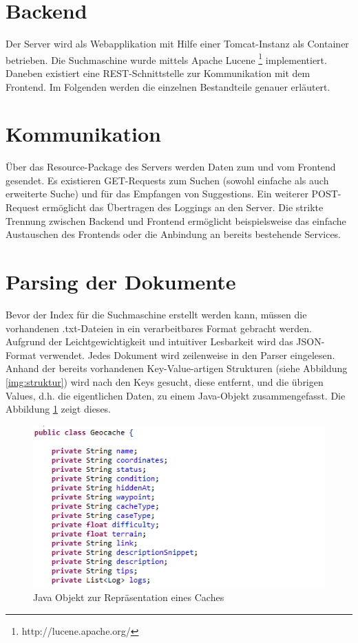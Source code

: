 \documentclass[11pt,a4paper]{scrreprt}
\begin{document}
\section{Backend}
Der Server wird als Webapplikation mit Hilfe einer Tomcat-Instanz als Container betrieben. Die Suchmaschine wurde mittels Apache Lucene \footnote{http://lucene.apache.org/} implementiert. Daneben existiert eine REST-Schnittstelle zur Kommunikation mit dem Frontend. Im Folgenden werden die einzelnen Bestandteile genauer erläutert.

\section{Kommunikation}
Über das Resource-Package des Servers werden Daten zum und vom Frontend gesendet. Es existieren GET-Requests zum Suchen (sowohl einfache als auch erweiterte Suche) und für das Empfangen von Suggestions. Ein weiterer POST-Request ermöglicht das Übertragen des Loggings an den Server. Die strikte Trennung zwischen Backend und Frontend ermöglicht beispielsweise das einfache Austauschen des Frontends oder die Anbindung an bereits bestehende Services.

\section{Parsing der Dokumente}
Bevor der Index für die Suchmaschine erstellt werden kann, müssen die vorhandenen .txt-Dateien in ein verarbeitbares Format gebracht werden. Aufgrund der Leichtgewichtigkeit und intuitiver Lesbarkeit wird das JSON-Format verwendet.
Jedes Dokument wird zeilenweise in den Parser eingelesen. Anhand der bereits vorhandenen Key-Value-artigen Strukturen (siehe Abbildung \ref{img:struktur}) wird nach den Keys gesucht, diese entfernt, und die übrigen Values, d.h. die eigentlichen Daten, zu einem Java-Objekt zusammengefasst. Die Abbildung \ref{img:objekt} zeigt dieses. 

\begin{figure}
	\centering
	\includegraphics[height=0.3\textheight]{cache_objekt.png}
	\caption{Java Objekt zur Repräsentation eines Caches}
	\label{img:objekt}
\end{figure}
\end{document}
